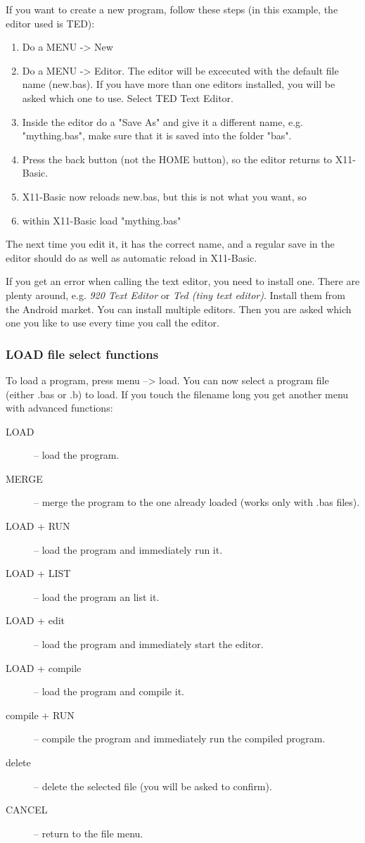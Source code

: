 If you want to create a new program, follow these steps  (in this example, the editor used is TED):

\begin{enumerate}
\item Do a MENU -> New
\item Do a MENU -> Editor. The editor will be excecuted with the default file name (new.bas). 
If you have more than one editors installed, you will be asked which one to use. Select TED Text Editor.
\item Inside the editor do a "Save As" and give it a different name, e.g. "mything.bas", make sure that it is saved 
into the folder "bas".
\item Press the back button (not the HOME button), so the editor returns to X11-Basic.
\item X11-Basic now reloads new.bas, but this is not what you want, so
\item within X11-Basic load "mything.bas"
\end{enumerate}
The next time you edit it, it has the correct name, and a regular save in the editor should do
 as well as automatic reload in X11-Basic.

If you get an error when calling the text editor, you need to install one. There
are plenty around, e.g. {\em 920 Text Editor} or {\em Ted (tiny text editor)}.
Install them from the Android market. You can install multiple editors. Then you
are asked which one you like to use every time you call the editor.

\subsubsection*{LOAD file select functions}

To load a program, press menu --> load. You can now select a program file 
(either .bas or .b) to load. If you touch the filename long you get another 
menu with advanced functions: 
\begin{description}
\item[LOAD] -- load the program.
\item[MERGE] -- merge the program to the one already loaded (works only with .bas files).
\item[LOAD + RUN] -- load the program and immediately run it.
\item[LOAD + LIST] -- load the program an list it.
\item[LOAD + edit] -- load the program and immediately start the editor.
\item[LOAD + compile] -- load the program and compile it.
\item[compile + RUN] -- compile the program and immediately run the compiled program.
\item[delete]   -- delete the selected file (you will be asked to confirm).
\item[CANCEL]   -- return to the file menu.
\end{description}

